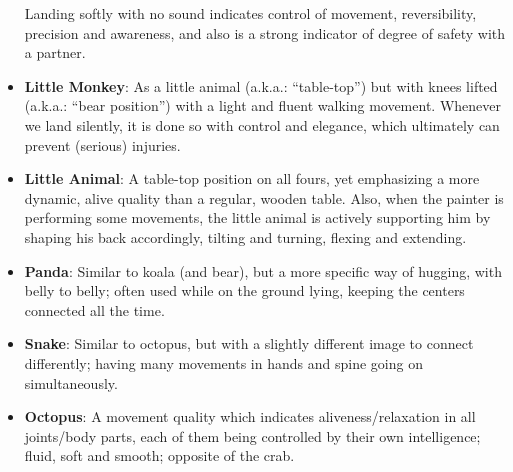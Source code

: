 \begin{itemize}
    Landing softly with no sound indicates control of movement, reversibility, precision and awareness, and also is a strong indicator of degree of safety with a partner.
    \item \textbf{Little Monkey}: As a little animal (a.k.a.: ``table-top'') but with knees lifted (a.k.a.: ``bear position'') with a light and fluent walking movement.
    Whenever we land silently, it is done so with control and elegance, which ultimately can prevent (serious) injuries.
    \item \textbf{Little Animal}: A table-top position on all fours, yet emphasizing a more dynamic, alive quality than a regular, wooden table.
    Also, when the painter is performing some movements, the little animal is actively supporting him by shaping his back accordingly, tilting and turning, flexing and extending.
    \item \textbf{Panda}: Similar to koala (and bear), but a more specific way of hugging, with belly to belly; often used while on the ground lying, keeping the centers connected all the time.
    \item \textbf{Snake}: Similar to octopus, but with a slightly different image to connect differently; having many movements in hands and spine going on simultaneously.
    \item \textbf{Octopus}: A movement quality which indicates aliveness/relaxation in all joints/body parts, each of them being controlled by their own intelligence; fluid, soft and smooth; opposite of the crab.
\end{itemize}
